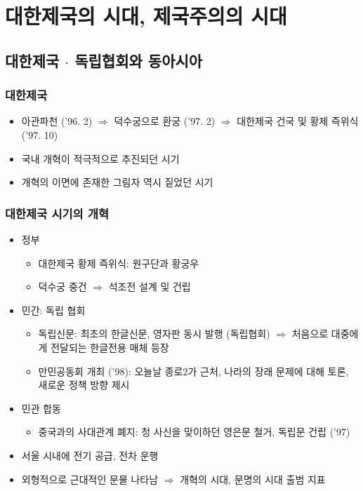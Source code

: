 \section{대한제국의 시대, 제국주의의 시대}

\subsection{대한제국 $\cdot$ 독립협회와 동아시아}

\subsubsection*{대한제국}
\begin{itemize}
    \item 아관파천 ('96. 2) $\Rightarrow$ 덕수궁으로 환궁 ('97. 2) $\Rightarrow$ 대한제국 건국 및 황제 즉위식 ('97. 10)
    \item 국내 개혁이 적극적으로 추진되던 시기
    \item 개혁의 이면에 존재한 그림자 역시 짙었던 시기
\end{itemize}

\subsubsection*{대한제국 시기의 개혁}
\begin{itemize}
    \item 정부
    \begin{itemize}
        \item 대한제국 황제 즉위식: 원구단과 황궁우
        \item 덕수궁 중건 $\Rightarrow$ 석조전 설계 및 건립
    \end{itemize}
    \item 민간: 독립 협회
    \begin{itemize}
        \item 독립신문: 최초의 한글신문, 영자판 동시 발행 (독립협회) $\Rightarrow$ 처음으로 대중에게 전달되는 한글전용 매체 등장
        \item 만민공동회 개최 ('98): 오늘날 종로2가 근처, 나라의 장래 문제에 대해 토론, 새로운 정책 방향 제시
    \end{itemize}
    \item 민관 합동
    \begin{itemize}
        \item 중국과의 사대관계 폐지: 청 사신을 맞이하던 영은문 철거, 독립문 건립 ('97)
    \end{itemize}
    \item 서울 시내에 전기 공급, 전차 운행
    \item 외형적으로 근대적인 문물 나타남 $\Rightarrow$ 개혁의 시대, 문명의 시대 출범 지표
\end{itemize}

